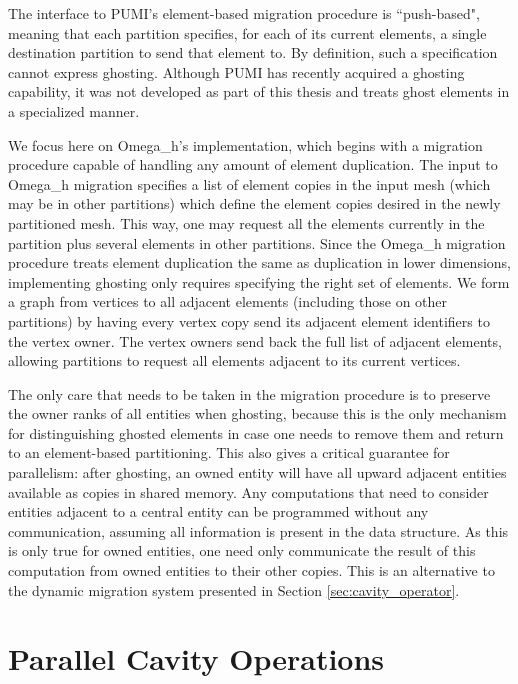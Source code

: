 The interface to PUMI's element-based migration procedure is
``push-based", meaning that each partition specifies, for each
of its current elements, a single destination partition to send
that element to.
By definition, such a specification cannot express ghosting.
Although PUMI has recently acquired a ghosting capability, it was
not developed as part of this thesis and treats ghost elements
in a specialized manner.

We focus here on Omega\_h's implementation, which begins with
a migration procedure capable of handling any amount of element duplication.
The input to Omega\_h migration specifies a list of element copies
in the input mesh (which may be in other partitions) which define
the element copies desired in the newly partitioned mesh.
This way, one may request all the elements currently in the
partition plus several elements in other partitions.
Since the Omega\_h migration procedure treats element duplication
the same as duplication in lower dimensions, implementing ghosting
only requires specifying the right set of elements.
We form a graph from vertices to all adjacent elements (including
those on other partitions) by having every vertex copy send its
adjacent element identifiers to the vertex owner.
The vertex owners send back the full list of adjacent elements,
allowing partitions to request all elements adjacent to its current
vertices.

The only care that needs to be taken in the migration procedure
is to preserve the owner ranks of all entities when ghosting,
because this is the only mechanism for distinguishing ghosted
elements in case one needs to remove them and return to
an element-based partitioning.
This also gives a critical guarantee for parallelism:
after ghosting, an owned entity will have all upward adjacent
entities available as copies in shared memory.
Any computations that need to consider entities adjacent to
a central entity can be programmed without any communication,
assuming all information is present in the data structure.
As this is only true for owned entities, one need only communicate
the result of this computation from owned entities to their other
copies.
This is an alternative to the dynamic migration system
presented in Section \ref{sec:cavity_operator}.

\section{Parallel Cavity Operations}
\label{sec:cavity_sched}

